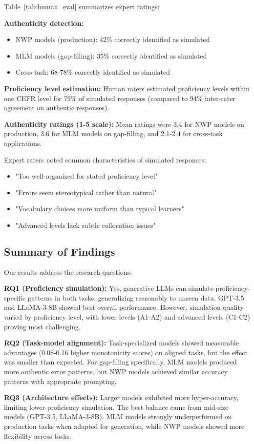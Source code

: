 Table~\ref{tab:human_eval} summarizes expert ratings:

\textbf{Authenticity detection:}
\begin{itemize}
    \item NWP models (production): 42\% correctly identified as simulated
    \item MLM models (gap-filling): 35\% correctly identified as simulated
    \item Cross-task: 68-78\% correctly identified as simulated
\end{itemize}

\textbf{Proficiency level estimation:} Human raters estimated proficiency levels within one CEFR level for 79\% of simulated responses (compared to 94\% inter-rater agreement on authentic responses).

\textbf{Authenticity ratings (1-5 scale):} Mean ratings were 3.4 for NWP models on production, 3.6 for MLM models on gap-filling, and 2.1-2.4 for cross-task applications.

Expert raters noted common characteristics of simulated responses:
\begin{itemize}
    \item "Too well-organized for stated proficiency level"
    \item "Errors seem stereotypical rather than natural"
    \item "Vocabulary choices more uniform than typical learners"
    \item "Advanced levels lack subtle collocation issues"
\end{itemize}

\subsection{Summary of Findings}

Our results address the research questions:

\textbf{RQ1 (Proficiency simulation):} Yes, generative LLMs can simulate proficiency-specific patterns in both tasks, generalizing reasonably to unseen data. GPT-3.5 and LLaMA-3-8B showed best overall performance. However, simulation quality varied by proficiency level, with lower levels (A1-A2) and advanced levels (C1-C2) proving most challenging.

\textbf{RQ2 (Task-model alignment):} Task-specialized models showed measurable advantages (0.08-0.16 higher monotonicity scores) on aligned tasks, but the effect was smaller than expected. For gap-filling specifically, MLM models produced more authentic error patterns, but NWP models achieved similar accuracy patterns with appropriate prompting.

\textbf{RQ3 (Architecture effects):} Larger models exhibited more hyper-accuracy, limiting lower-proficiency simulation. The best balance came from mid-size models (GPT-3.5, LLaMA-3-8B). MLM models strongly underperformed on production tasks when adapted for generation, while NWP models showed more flexibility across tasks.
